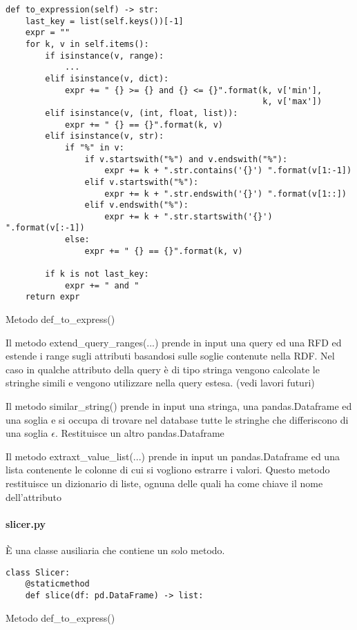 \begin{listing}[H]
\begin{verbatim}
def to_expression(self) -> str:
    last_key = list(self.keys())[-1]
    expr = ""
    for k, v in self.items():
        if isinstance(v, range):
            ...
        elif isinstance(v, dict):
            expr += " {} >= {} and {} <= {}".format(k, v['min'],
                                                    k, v['max'])
        elif isinstance(v, (int, float, list)):
            expr += " {} == {}".format(k, v)
        elif isinstance(v, str):
            if "%" in v:
                if v.startswith("%") and v.endswith("%"):
                    expr += k + ".str.contains('{}') ".format(v[1:-1])
                elif v.startswith("%"):
                    expr += k + ".str.endswith('{}') ".format(v[1::])
                elif v.endswith("%"):
                    expr += k + ".str.startswith('{}') ".format(v[:-1])
            else:
                expr += " {} == {}".format(k, v)

        if k is not last_key:
            expr += " and "
    return expr
\end{verbatim}
\caption{Metodo def{\_}to{\_}express()}
\label{Code:9}
\end{listing}

Il metodo extend{\_}query{\_}ranges(...) prende in input una query ed una RFD ed estende i range sugli attributi basandosi sulle soglie contenute nella RDF. Nel caso in qualche attributo della query è di tipo stringa vengono calcolate le stringhe simili e vengono utilizzare nella query estesa.
(vedi lavori futuri)

Il metodo similar{\_}string() prende in input una stringa, una pandas.Dataframe ed una soglia e si occupa di trovare nel database tutte le stringhe che differiscono di una soglia $\epsilon$. Restituisce un altro pandas.Dataframe 

Il metodo extraxt{\_}value{\_}list(...) prende in input un pandas.Dataframe ed una lista contenente le colonne di cui si vogliono estrarre i valori. Questo metodo restituisce un dizionario di liste, ognuna delle quali ha come chiave il nome dell'attributo

\paragraph{slicer.py}
È una classe ausiliaria che contiene un solo metodo.
\begin{listing}[H]
\begin{verbatim}
class Slicer:
    @staticmethod
    def slice(df: pd.DataFrame) -> list:
\end{verbatim}
\caption{Metodo def{\_}to{\_}express()}
\label{Code:9}
\end{listing}

